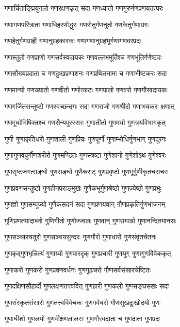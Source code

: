\twolineshloka
{गणार्चिताङ्घ्रियुगलो गणरक्षणकृत् सदा}%
{गणध्यातो गणगुरुर्गणप्रणयतत्परः}%

\twolineshloka
{गणागणपरित्राता गणाधिहरणोद्धुरः}%
{गणसेतुर्गणनुतो गणकेतुर्गणाग्रगः}%

\twolineshloka
{गणहेतुर्गणग्राही गणानुग्रहकारकः}%
{गणागणानुग्रहभूर्गणागणवरप्रदः}%

\twolineshloka
{गणस्तुतो गणप्राणो गणसर्वस्वदायकः}%
{गणवल्लभमूर्तिश्च गणभूतिर्गणेष्टदः}%

\twolineshloka
{गणसौख्यप्रदाता च गणदुःखप्रणाशनः}%
{गणप्रथितनामा च गणाभीष्टकरः सदा}%

\twolineshloka
{गणमान्यो गणख्यातो गणवीतो गणोत्कटः}%
{गणपालो गणवरो गणगौरवदायकः}%

\twolineshloka
{गणगर्जितसन्तुष्टो गणस्वच्छन्दगः सदा}%
{गणराजो गणश्रीदो गणाभयकरः क्षणात्}%

\twolineshloka
{गणमूर्धाभिषिक्तश्च गणसैन्यपुरस्सरः}%
{गुणातीतो गुणमयो गुणत्रयविभागकृत्}%

\twolineshloka
{गुणी गुणाकृतिधरो गुणशाली गुणप्रियः}%
{गुणपूर्णो गुणाम्भोधिर्गुणभाग् गुणदूरगः}%

\twolineshloka
{गुणागुणवपुर्गौणशरीरो गुणमण्डितः}%
{गुणस्त्रष्टा गुणेशानो गुणेशोऽथ गुणेश्वरः}%

\twolineshloka
{गुणसृष्टजगत्सङ्घो गुणसङ्घो गुणैकराट्}%
{गुणप्रवृष्टो गुणभूर्गुणीकृतचराचरः}%

\twolineshloka
{गुणप्रवणसन्तुष्टो गुणहीनपराङ्मुखः}%
{गुणैकभूर्गुणश्रेष्ठो गुणज्येष्ठो गुणप्रभुः}%

\twolineshloka
{गुणज्ञो गुणसम्पूज्यो गुणैकसदनं सदा}%
{गुणप्रणयवान् गौणप्रकृतिर्गुणभाजनम्}%

\twolineshloka
{गुणिप्रणतपादाब्जो गुणिगीतो गुणोज्ज्वलः}%
{गुणवान् गुणसम्पन्नो गुणानन्दितमानसः}%

\twolineshloka
{गुणसञ्चारचतुरो गुणसञ्चयसुन्दरः}%
{गुणगौरो गुणाधारो गुणसंवृतचेतनः}%

\twolineshloka
{गुणकृद्गुणभृन्नित्यं गुणाग्र्यो गुणपारदृक्}%
{गुणप्रचारी गुणयुग् गुणागुणविवेककृत्}%

\twolineshloka
{गुणाकरो गुणकरो गुणप्रवणवर्धनः}%
{गुणगूढचरो गौणसर्वसंसारचेष्टितः}%

\twolineshloka
{गुणदक्षिणसौहार्दो गुणलक्षणतत्त्ववित्}%
{गुणहारी गुणकलो गुणसङ्घसखः सदा}%

\twolineshloka
{गुणसंस्कृतसंसारो गुणतत्त्वविवेचकः}%
{गुणगर्वधरो गौणसुखदुःखोदयो गुणः}%

\twolineshloka
{गुणाधीशो गुणलयो गुणवीक्षणलालसः}%
{गुणगौरवदाता च गुणदाता गुणप्रदः}%


